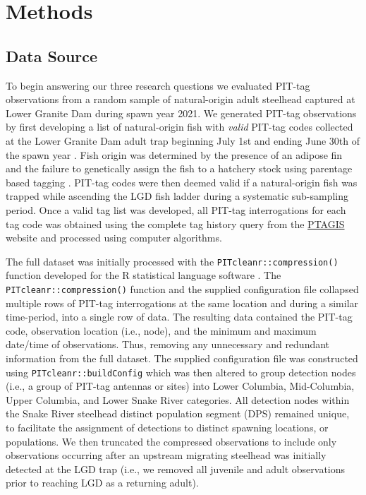 \documentclass[11pt,a4paper,]{article}
\begin{document}
\hypertarget{methods}{%
\section{Methods}\label{methods}}

\hypertarget{data-source}{%
\subsection{Data Source}\label{data-source}}

To begin answering our three research questions we evaluated PIT-tag observations from a random sample of natural-origin adult steelhead captured at Lower Granite Dam during spawn year 2021. We generated PIT-tag observations by first developing a list of natural-origin fish with \emph{valid} PIT-tag codes collected at the Lower Granite Dam adult trap beginning July 1st and ending June 30th of the spawn year \autocite{need_citation}. Fish origin was determined by the presence of an adipose fin and the failure to genetically assign the fish to a hatchery stock using parentage based tagging \autocite{IDFGcitation,steeleValidationParentagebasedTagging2013}. PIT-tag codes were then deemed valid if a natural-origin fish was trapped while ascending the LGD fish ladder during a systematic sub-sampling period. Once a valid tag list was developed, all PIT-tag interrogations for each tag code was obtained using the complete tag history query from the \href{https://www.ptagis.org}{PTAGIS} website and processed using computer algorithms.

The full dataset was initially processed with the \texttt{PITcleanr::compression()} function \autocite{R-PITcleanr} developed for the R statistical language software \autocite{R-base}. The \texttt{PITcleanr::compression()} function and the supplied configuration file collapsed multiple rows of PIT-tag interrogations at the same location and during a similar time-period, into a single row of data. The resulting data contained the PIT-tag code, observation location (i.e., node), and the minimum and maximum date/time of observations. Thus, removing any unnecessary and redundant information from the full dataset. The supplied configuration file was constructed using \texttt{PITcleanr::buildConfig} which was then altered to group detection nodes (i.e., a group of PIT-tag antennas or sites) into Lower Columbia, Mid-Columbia, Upper Columbia, and Lower Snake River categories. All detection nodes within the Snake River steelhead distinct population segment (DPS) remained unique, to facilitate the assignment of detections to distinct spawning locations, or populations. We then truncated the compressed observations to include only observations occurring after an upstream migrating steelhead was initially detected at the LGD trap (i.e., we removed all juvenile and adult observations prior to reaching LGD as a returning adult).
\end{document}
